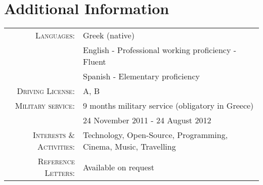 \documentclass[11pt]{article}
\begin{document}

\section{Additional Information}

\begin{tabular}{rl}
    \textsc{Languages:} 
    & Greek (native) \\
    & English - Professional working proficiency - Fluent \\
    & Spanish - Elementary proficiency \\

    \textsc{Driving License:} 
    & A, B \\
    
    \textsc{Military service:} 
    & 9 months military service (obligatory in Greece) \\ 
    & 24 November 2011 - 24 August 2012\\
    
    \textsc{Interests \& Activities:} 
    & Technology, Open-Source, Programming, Cinema, Music, Travelling \\

    \textsc{Reference Letters:} 
    & Available on request
\end{tabular}
\end{document}
